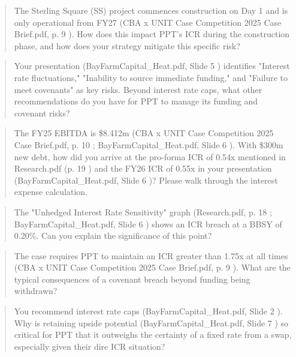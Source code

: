 \documentclass[11pt, a4paper, british]{article}
\begin{document}
\newpage

\begin{quote}
    The Sterling Square (SS) project commences construction on Day 1 and is only operational from FY27 (CBA x UNIT Case Competition 2025 Case Brief.pdf, p. 9 ). How does this impact PPT's ICR during the construction phase, and how does your strategy mitigate this specific risk?
\end{quote}

\newpage

\begin{quote}
    Your presentation (BayFarmCapital_Heat.pdf, Slide 5 ) identifies "Interest rate fluctuations," "Inability to source immediate funding," and "Failure to meet covenants" as key risks. Beyond interest rate caps, what other recommendations do you have for PPT to manage its funding and covenant risks?
\end{quote}

\newpage

\begin{quote}
    The FY25 EBITDA is \$8.412m (CBA x UNIT Case Competition 2025 Case Brief.pdf, p. 10 ; BayFarmCapital_Heat.pdf, Slide 6 ). With \$300m new debt, how did you arrive at the pro-forma ICR of 0.54x mentioned in Research.pdf (p. 19 ) and the FY26 ICR of 0.55x in your presentation (BayFarmCapital_Heat.pdf, Slide 6 )? Please walk through the interest expense calculation.
\end{quote}

\newpage

\begin{quote}
    The "Unhedged Interest Rate Sensitivity" graph (Research.pdf, p. 18 ; BayFarmCapital_Heat.pdf, Slide 6 ) shows an ICR breach at a BBSY of 0.20\%. Can you explain the significance of this point?
\end{quote}

\newpage

\begin{quote}
    The case requires PPT to maintain an ICR greater than 1.75x at all times (CBA x UNIT Case Competition 2025 Case Brief.pdf, p. 9 ). What are the typical consequences of a covenant breach beyond funding being withdrawn?
\end{quote}

\newpage

\begin{quote}
    You recommend interest rate caps (BayFarmCapital_Heat.pdf, Slide 2 ). Why is retaining upside potential (BayFarmCapital_Heat.pdf, Slide 7 ) so critical for PPT that it outweighs the certainty of a fixed rate from a swap, especially given their dire ICR situation?
\end{quote}
\end{document}
